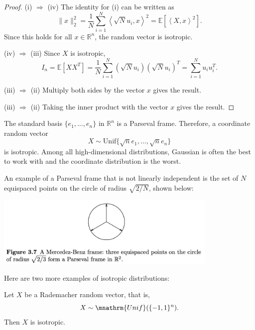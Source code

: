 \begin{proof}
(i) $\Rightarrow$ (iv)
The identity for (i) can be written as 
\[ \lVert x \rVert_{2}^2 = \frac{1}{N} \sum_{i = 1}^{N} \left\langle \sqrt{N} u_i, x \right\rangle^2 
= \mathbb{E}[\left\langle X, x \right\rangle^2]. \]
Since this holds for all $x \in \mathbb{R}^n$, the random vector is isotropic.

(iv) $\Rightarrow$ (iii)
Since $X$ is isotropic, 
\[ I_n = \mathbb{E}[XX^T] = \frac{1}{N}\sum_{i = 1}^{N} \left( \sqrt{N} u_i \right) 
\left( \sqrt{N} u_i \right)^T = \sum_{i = 1}^{N} u_i u_i^T. \]

(iii) $\Rightarrow$ (ii)
Multiply both sides by the vector $x$ gives the result.

(iii) $\Rightarrow$ (ii)
Taking the inner product with the vector $x$ gives the result.
\end{proof}

\begin{example}
\label{ex:3.3.14}
The standard basis $\{e_1, \dots, e_n\}$ in $\mathbb{R}^n$ is a Parseval frame. Therefore, a coordinate 
random vector 
\[ X \sim \mathrm{Unif}\{\sqrt{n}e_1, \dots, \sqrt{n}e_n\} \]
is isotropic. Among all high-dimensional distributions, Gaussian is often the best to work with and the 
coordinate distribution is the worst.
\end{example}

\begin{example}
\label{ex:3.3.15}
An example of a Parseval frame that is not linearly independent is the set of $N$ equispaced points on the 
circle of radius $\sqrt{2/N}$, shown below:
\begin{center}
	\includegraphics[width=0.8\textwidth]{Chapter 3/fig3-7.png}
\end{center}
\end{example}

Here are two more examples of isotropic distributions:

\begin{example}
\label{ex:3.3.16}
Let $X$ be a Rademacher random vector, that is, 
\[ X \sim \mnathrm{Unif}(\{-1, 1\}^n). \]
Then $X$ is isotropic.
\end{example}

